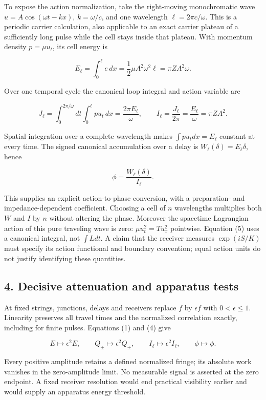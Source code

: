 \documentclass[11pt,a4paper]{article}
\begin{document}
To expose the action normalization, take the right-moving monochromatic
wave \(u=A\cos(\omega t-kx)\), \(k=\omega/c\), and one wavelength
\(\ell=2\pi c/\omega\). This is a periodic carrier calculation, also
applicable to an exact carrier plateau of a sufficiently long pulse
while the cell stays inside that plateau. With momentum density
\(p=\mu u_t\), its cell energy is

\[
E_\ell=\int_0^\ell e\,dx
 =\frac12\mu A^2\omega^2\ell=\pi Z A^2\omega.
\]

Over one temporal cycle the canonical loop integral and action variable
are

\[
J_\ell=\int_0^{2\pi/\omega}\!dt\int_0^\ell p u_t\,dx
 =\frac{2\pi E_\ell}{\omega},\qquad
I_\ell=\frac{J_\ell}{2\pi}=\frac{E_\ell}{\omega}=\pi Z A^2. \tag{4}
\]

Spatial integration over a complete wavelength makes
\(\int p u_tdx=E_\ell\) constant at every time. The signed canonical
accumulation over a delay is \(W_\ell(\delta)=E_\ell\delta\), hence

\[
\phi=\frac{W_\ell(\delta)}{I_\ell}. \tag{5}
\]

This supplies an explicit action-to-phase conversion, with a
preparation- and impedance-dependent coefficient. Choosing a cell of
\(n\) wavelengths multiplies both \(W\) and \(I\) by \(n\) without
altering the phase. Moreover the spacetime Lagrangian action of this
pure traveling wave is zero: \(\mu u_t^2=Tu_x^2\) pointwise. Equation
(5) uses a canonical integral, not \(\int Ldt\). A claim that the
receiver measures \(\exp(iS/K)\) must specify its action functional and
boundary convention; equal action units do not justify identifying these
quantities.

\hypertarget{decisive-attenuation-and-apparatus-tests}{%
\subsection{4. Decisive attenuation and apparatus
tests}\label{decisive-attenuation-and-apparatus-tests}}

At fixed strings, junctions, delays and receivers replace \(f\) by
\(\epsilon f\) with \(0<\epsilon\le1\). Linearity preserves all travel
times and the normalized correlation exactly, including for finite
pulses. Equations (1) and (4) give

\[
E\mapsto\epsilon^2E,\qquad Q_\pm\mapsto\epsilon^2Q_\pm,
\qquad I_\ell\mapsto\epsilon^2I_\ell,
\qquad \phi\mapsto\phi. \tag{6}
\]

Every positive amplitude retains a defined normalized fringe; its
absolute work vanishes in the zero-amplitude limit. No measurable signal
is asserted at the zero endpoint. A fixed receiver resolution would end
practical visibility earlier and would supply an apparatus energy
threshold.
\end{document}
